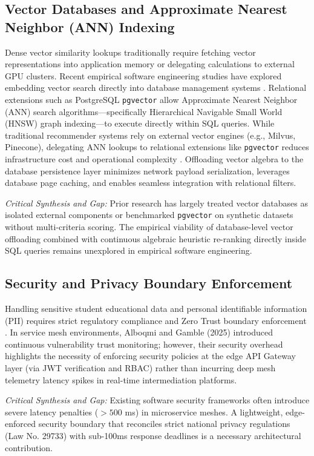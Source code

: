 \documentclass[a4paper,fleqn]{cas-dc}
\begin{document}
\subsection{Vector Databases and Approximate Nearest Neighbor (ANN) Indexing}
Dense vector similarity lookups traditionally require fetching vector representations into application memory or delegating calculations to external GPU clusters. Recent empirical software engineering studies have explored embedding vector search directly into database management systems \cite{ertugrul2025}. Relational extensions such as PostgreSQL \texttt{pgvector} allow Approximate Nearest Neighbor (ANN) search algorithms---specifically Hierarchical Navigable Small World (HNSW) graph indexing---to execute directly within SQL queries. While traditional recommender systems rely on external vector engines (e.g., Milvus, Pinecone), delegating ANN lookups to relational extensions like \texttt{pgvector} reduces infrastructure cost and operational complexity \cite{rebaza2025, huaman2024}. Offloading vector algebra to the database persistence layer minimizes network payload serialization, leverages database page caching, and enables seamless integration with relational filters.

\medskip\noindent\textit{Critical Synthesis and Gap:} Prior research has largely treated vector databases as isolated external components or benchmarked \texttt{pgvector} on synthetic datasets without multi-criteria scoring. The empirical viability of database-level vector offloading combined with continuous algebraic heuristic re-ranking directly inside SQL queries remains unexplored in empirical software engineering.

\subsection{Security and Privacy Boundary Enforcement}
Handling sensitive student educational data and personal identifiable information (PII) requires strict regulatory compliance \cite{ley29733, dl1270} and Zero Trust boundary enforcement \cite{alboqmi2025}. In service mesh environments, Alboqmi and Gamble (2025) \cite{alboqmi2025} introduced continuous vulnerability trust monitoring; however, their security overhead highlights the necessity of enforcing security policies at the edge API Gateway layer (via JWT verification and RBAC) rather than incurring deep mesh telemetry latency spikes in real-time intermediation platforms.

\medskip\noindent\textit{Critical Synthesis and Gap:} Existing software security frameworks often introduce severe latency penalties ($>500$ ms) in microservice meshes. A lightweight, edge-enforced security boundary that reconciles strict national privacy regulations (Law No. 29733) with sub-100ms response deadlines is a necessary architectural contribution.
\end{document}

